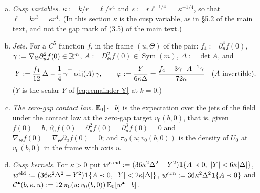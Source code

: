 \begin{convention}\label{conv:cusp-notation}
\begin{enumerate}[(a),leftmargin=2em,itemsep=2pt]
\item \emph{Cusp variables.} $\kappa:=k/r=\ell/r^4$ and $s:=r\ell^{-1/4}=\kappa^{-1/4}$, so that $\ell=kr^3=\kappa r^4$. (In this section $\kappa$ is the cusp variable, as in \S5.2 of the main text, and not the gap mark of (3.5) of the main text.)
\item \emph{Jets.} For a $C^5$ function $f$, in the frame $(u,\Theta)$ of the pair: $f_4:=\partial_u^4f(0)$, $\gamma:=\nabla_\Theta\partial_u^2f(0)\in\mathbb R^m$, $A:=D_\Theta^2f(0)\in\operatorname{Sym}(m)$, $\Delta:=\det A$, and
\begin{equation}\label{eq:cusp-Y}
Y:=\frac{f_4}{12}\,\Delta-\frac14\,\gamma^{\top}\operatorname{adj}(A)\,\gamma,\qquad \varphi:=\frac{Y}{6\kappa\Delta}=\frac{f_4-3\gamma^{\top}A^{-1}\gamma}{72\kappa}\quad(A\text{ invertible}).
\end{equation}
($Y$ is the scalar $Y$ of \eqref{eq:remainder-Y} at $k=0$.)
\item \emph{The zero-gap contact law.} $\mathbb E_0[\,\cdot\mid b]$ is the expectation over the jets of the field under the contact law at the zero-gap target $v_0(b,0)$, that is, given $f(0)=b$, $\partial_uf(0)=\partial_u^2f(0)=\partial_u^3f(0)=0$ and $\nabla_\Theta f(0)=\nabla_\Theta\partial_uf(0)=0$; and $\pi_0(u;v_0(b,0))$ is the density of $U_0$ at $v_0(b,0)$ in the frame with axis $u$.
\item \emph{Cusp kernels.} For $\kappa>0$ put $w^{\cand}:=(36\kappa^2\Delta^2-Y^2)\ind\{A\prec0,\ |Y|<6\kappa|\Delta|\}$, $w^{\eld}:=(36\kappa^2\Delta^2-Y^2)\ind\{A\prec0,\ |Y|<2\kappa|\Delta|\}$, $w^{\mathrm{con}}:=36\kappa^2\Delta^2\mathbf 1\{A\prec0\}$ and $\mathcal C^\bullet(b,\kappa,u):=12\,\pi_0(u;v_0(b,0))\,\mathbb E_0[w^\bullet\mid b]$.
\end{enumerate}
\end{convention}

